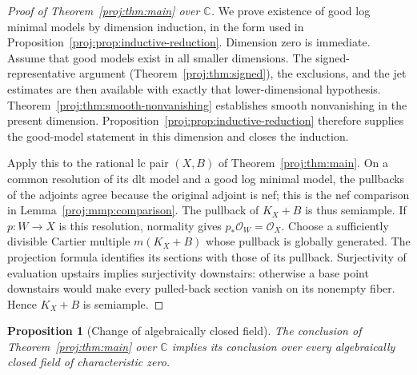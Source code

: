\documentclass[11pt,letterpaper]{article}
\newtheorem{proposition}[theorem]{Proposition}
\theoremstyle{definition}
\theoremstyle{remark}
\begin{document}
\begin{proof}[Proof of Theorem~\ref{proj:thm:main} over \(\mathbb{C}\)]
We prove existence of good log minimal models by dimension induction,
in the form used in Proposition~\ref{proj:prop:inductive-reduction}.
Dimension zero is immediate. Assume that good models exist in all
smaller dimensions. The signed-representative argument
(Theorem~\ref{proj:thm:signed}), the exclusions, and the jet estimates are
then available with exactly that lower-dimensional hypothesis.
Theorem~\ref{proj:thm:smooth-nonvanishing} establishes smooth
nonvanishing in the present dimension. Proposition~\ref{proj:prop:inductive-reduction}
therefore supplies the good-model statement in this dimension and
closes the induction.

Apply this to the rational lc pair \((X,B)\) of
Theorem~\ref{proj:thm:main}. On a common resolution of its dlt model and a
good log minimal model, the pullbacks of the adjoints agree because
the original adjoint is nef; this is the nef comparison in
Lemma~\ref{proj:mmp:comparison}. The pullback of \(K_X+B\)
is thus semiample. If \(p:W\to X\) is this resolution, normality gives
\(p_*\mathcal{O}_W=\mathcal{O}_X\). Choose a sufficiently divisible Cartier multiple
\(m(K_X+B)\) whose pullback is globally generated. The projection
formula identifies its sections with those of its pullback.
Surjectivity of evaluation upstairs implies surjectivity downstairs:
otherwise a base point downstairs would make every pulled-back
section vanish on its nonempty fiber. Hence \(K_X+B\) is semiample.
\end{proof}

\begin{proposition}[Change of algebraically closed field]\label{proj:prop:field-descent}
The conclusion of Theorem~\ref{proj:thm:main} over \(\mathbb{C}\) implies its
conclusion over every algebraically closed field of characteristic zero.
\end{proposition}
\end{document}
